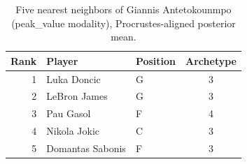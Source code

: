 \begin{table}[htbp]
  \centering\small
  \begin{tabular}{rllc}
    \toprule
    Rank & Player & Position & Archetype \\
    \midrule
    1 & Luka Doncic & G & 3 \\
    2 & LeBron James & G & 3 \\
    3 & Pau Gasol & F & 4 \\
    4 & Nikola Jokic & C & 3 \\
    5 & Domantas Sabonis & F & 3 \\
    \bottomrule
  \end{tabular}
  \caption{Five nearest neighbors of Giannis Antetokounmpo (peak_value modality), Procrustes-aligned posterior mean.}
  \label{tab:Giannis_Antetokounmpo_neighbors_peak_value}
\end{table}

